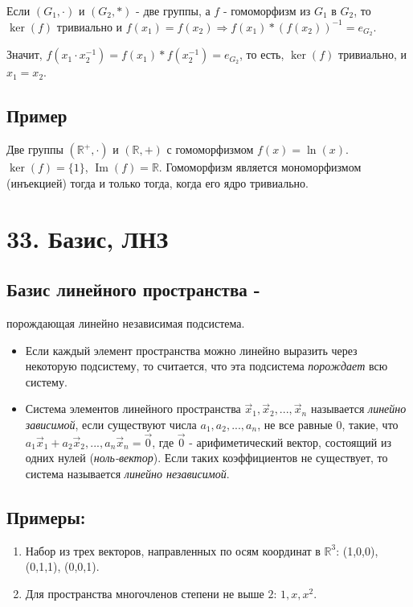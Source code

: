 \documentclass[12pt]{article}
\begin{document}
Если $(G_1,\cdot)$ и $(G_2,*)$ - две группы, а $f$ - гомоморфизм из $G_1$ в $G_2$, то $\operatorname{ker}(f)$ тривиально и $f(x_1)=f(x_2)\Rightarrow f(x_1)*(f(x_2))^{-1}=e_{G_2}$.

Значит, $f(x_1\cdot x_2^{-1})=f(x_1)*f(x_2^{-1})=e_{G_2}$, то есть, $\operatorname{ker}(f)$ тривиально, и $x_1=x_2$.

\subsection{Пример}

Две группы $(\mathbb{R}^{+},\cdot)$ и $(\mathbb{R},+)$ с гомоморфизмом $f(x) = \ln(x)$. $\ker(f) = \{1\}$, $\operatorname{Im}(f) = \mathbb{R}$. Гомоморфизм является мономорфизмом (инъекцией) тогда и только тогда, когда его ядро тривиально.

    \section{33. Базис, ЛНЗ}
    \subsection{Базис линейного пространства -} порождающая линейно независимая подсистема.

    \begin{itemize}
        \item Если каждый элемент пространства можно линейно выразить через некоторую подсистему, то считается, что эта подсистема \textit{порождает} всю систему.

        \item Система элементов линейного пространства $\vec x_{1}, \vec x_{2}, ..., \vec x_{n}$ называется \textit{линейно зависимой}, если существуют числа $a_{1}, a_{2},..., a_{n}$, не все равные 0, такие, что $a_{1}\vec x_{1} + a_{2}\vec x_{2},..., a_{n}\vec x_{n} = \vec 0$, где $\vec 0$ - арифиметический вектор, состоящий из одних нулей (\textit{ноль-вектор}). Если таких коэффициентов не существует, то система называется \textit{линейно независимой}.

    \end{itemize}
    \subsection{Примеры:}

    \begin{enumerate}
        \item Набор из трех векторов, направленных по осям координат в $\mathbb{R}^{3}$:
              (1,0,0), (0,1,1), (0,0,1).

        \item Для пространства многочленов степени не выше $2$: $1, x, x^{2}$.
    \end{enumerate}
\end{document}
